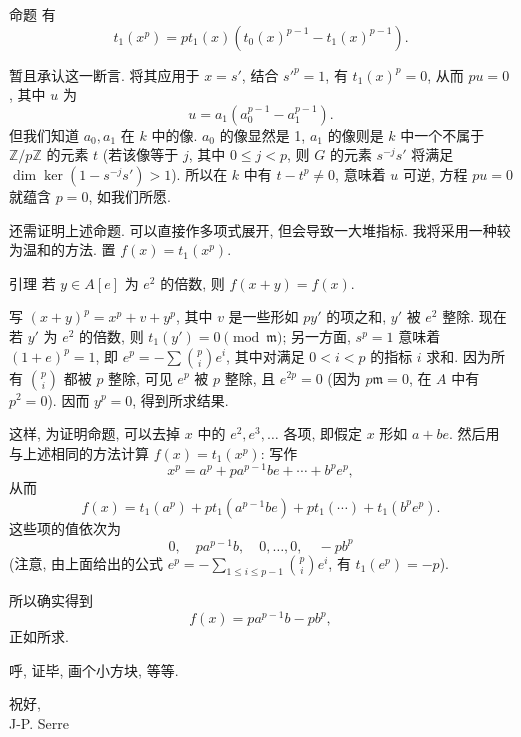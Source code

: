 \begin{origstatement}{命题}{}
有
\[t_1(x^p)=pt_1(x)(t_0(x)^{p-1}-t_1(x)^{p-1}).\]
\end{origstatement}
暂且承认这一断言. 将其应用于 $x=s'$, 结合 $s'^p=1$, 有 $t_1(x)^p=0$, 从而 $pu=0$, 其中 $u$ 为
\[u=a_1(a_0^{p-1}-a_1^{p-1}).\]
但我们知道 $a_0,a_1$ 在 $k$ 中的像. $a_0$ 的像显然是 1, $a_1$ 的像则是 $k$ 中一个不属于 $\mathbb Z/p\mathbb Z$ 的元素 $t$ (若该像等于 $j$, 其中 $0\leq j<p$, 则 $G$ 的元素 $s^{-j}s'$ 将满足 $\dim\ker(1-s^{-j}s')>1$). 所以在 $k$ 中有 $t-t^p\ne0$, 意味着 $u$ 可逆, 方程 $pu=0$ 就蕴含 $p=0$, 如我们所愿.

还需证明上述命题. 可以直接作多项式展开, 但会导致一大堆指标. 我将采用一种较为温和的方法. 置 $f(x)=t_1(x^p)$.

\begin{origstatement}{引理}{}
若 $y\in A[e]$ 为 $e^2$ 的倍数, 则 $f(x+y)=f(x)$.
\end{origstatement}
写 $(x+y)^p=x^p+v+y^p$, 其中 $v$ 是一些形如 $py'$ 的项之和, $y'$ 被 $e^2$ 整除. 现在若 $y'$ 为 $e^2$ 的倍数, 则 $t_1(y')=0\pmod{\mathfrak m}$; 另一方面, $s^p=1$ 意味着 $(1+e)^p=1$, 即 $e^p=-\sum\binom pi e^i$, 其中对满足 $0<i<p$ 的指标 $i$ 求和. 因为所有 $\binom pi$ 都被 $p$ 整除, 可见 $e^p$ 被 $p$ 整除, 且 $e^{2p}=0$ (因为 $p\mathfrak m=0$, 在 $A$ 中有 $p^2=0$). 因而 $y^p=0$, 得到所求结果.

这样, 为证明命题, 可以去掉 $x$ 中的 $e^2,e^3,\ldots$ 各项, 即假定 $x$ 形如 $a+be$. 然后用与上述相同的方法计算 $f(x)=t_1(x^p)$: 写作
\[x^p=a^p+pa^{p-1}be+\cdots+b^pe^p,\]
从而
\[f(x)=t_1(a^p)+pt_1(a^{p-1}be)+pt_1(\cdots)+t_1(b^pe^p).\]
这些项的值依次为
\[0,\quad pa^{p-1}b,\quad0,\ldots,0,\quad-pb^p\]
(注意, 由上面给出的公式 $e^p=-\sum_{1\leq i\leq p-1}\binom pi e^i$, 有 $t_1(e^p)=-p$).

所以确实得到
\[f(x)=pa^{p-1}b-pb^p,\]
正如所求.

呼, 证毕, 画个小方块, 等等.

\begin{flushright}祝好,\\J-P. Serre\end{flushright}
